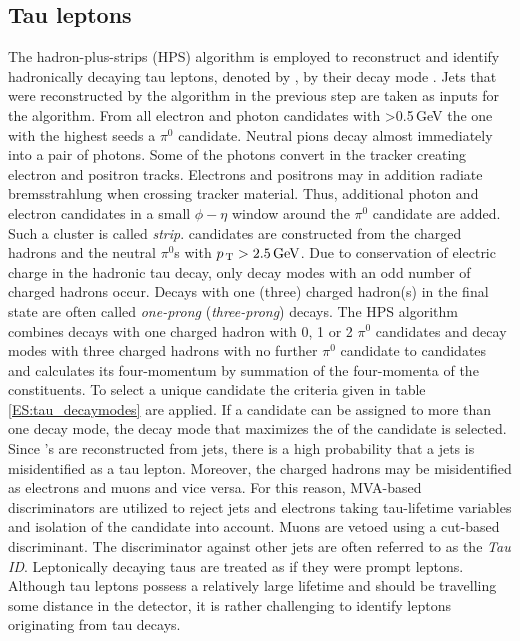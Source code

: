 \subsection{Tau leptons}
The hadron-plus-strips (HPS) algorithm \cite{hps1,CMS-DP-2017-006, CMS-DP-2017-002} is employed to reconstruct and identify hadronically decaying tau leptons, denoted by \tauh{}, by their decay mode . Jets that were reconstructed by the \antikt{} algorithm in the previous step are taken as inputs for the algorithm.
From all electron and photon candidates with \pt{}>0.5\,GeV the one with the highest \pt{} seeds a $\pi^0$ candidate. Neutral pions decay almost immediately into a pair of photons.
Some of the photons convert in the tracker creating electron and positron tracks. Electrons and positrons may in addition radiate bremsstrahlung when crossing tracker material.
Thus, additional photon and electron candidates in a small $\phi-\eta$ window around the $\pi^0$ candidate are added. Such a cluster is called \textit{strip}.  
\tauh{} candidates are constructed from the charged hadrons and the neutral $\pi^0$s with $p_\text{\,T}>\text{2.5\,{GeV}}$.
Due to conservation of electric charge in the hadronic tau decay, only decay modes with an odd number of charged hadrons occur. 
Decays with one (three) charged hadron(s) in the final state are often called \textit{one-prong} (\textit{three-prong}) decays. The HPS algorithm combines decays with one charged hadron with 0, 1 or 2 $\pi^0$ candidates and
decay modes with three charged hadrons with no further $\pi^0$ candidate to \tauh{} candidates and calculates its four-momentum by summation of the four-momenta of the constituents.
To select a unique \tauh{} candidate the criteria given in table \ref{ES:tau_decaymodes} are applied. If a candidate can be assigned to more than one decay mode, the decay mode that maximizes the \pt{} of the \tauh{} candidate is selected.
Since \tauh's are reconstructed from jets, there is a high probability that a jets is misidentified as a tau lepton. Moreover,
the charged hadrons may be misidentified as electrons and muons and vice versa. For this reason, MVA-based discriminators are utilized to reject jets and electrons taking tau-lifetime variables and isolation 
of the \tauh{} candidate into account. Muons are vetoed using a cut-based discriminant. The discriminator against other jets are often referred to as the \textit{Tau ID}. \newline{}
Leptonically decaying taus are treated as if they were prompt leptons. Although tau leptons possess a relatively large lifetime and should be travelling some distance in the detector, it is rather challenging to identify leptons originating from tau decays. 
